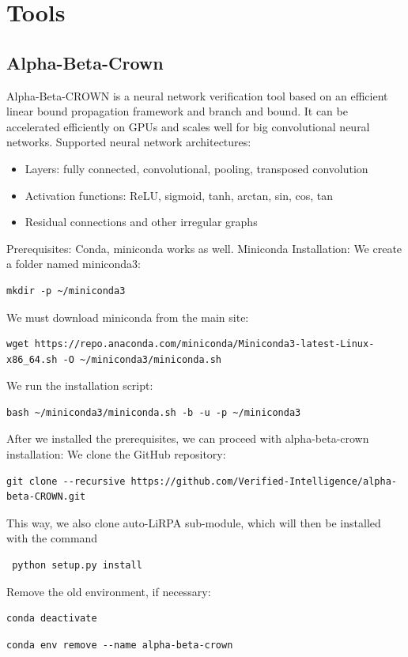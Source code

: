 \documentclass{article}
\begin{document}
\section{Tools}
\subsection{Alpha-Beta-Crown}
Alpha-Beta-CROWN\cite{alpha-beta} is a neural network verification tool based on an efficient linear bound propagation framework and branch and bound. It can be accelerated efficiently on GPUs and scales well for big convolutional neural networks.\newline
Supported neural network architectures:
\begin{itemize}
\item Layers: fully connected, convolutional, pooling, transposed convolution
\item Activation functions: ReLU, sigmoid, tanh, arctan, sin, cos, tan
\item Residual connections and other irregular graphs
\end{itemize}
\newline
Prerequisites: Conda, miniconda works as well.\newline
Miniconda Installation:
We create a folder named miniconda3:

\begin{verbatim}mkdir -p ~/miniconda3\end{verbatim}
We must download miniconda from the main site:
\begin{verbatim}wget https://repo.anaconda.com/miniconda/Miniconda3-latest-Linux-x86_64.sh -O ~/miniconda3/miniconda.sh\end{verbatim}
We run the installation script:
\begin{verbatim}bash ~/miniconda3/miniconda.sh -b -u -p ~/miniconda3
\end{verbatim}

After we installed the prerequisites, we can proceed with alpha-beta-crown installation:
We clone the GitHub repository:
\begin{verbatim}git clone --recursive https://github.com/Verified-Intelligence/alpha-beta-CROWN.git\end{verbatim}
This way, we also clone auto-LiRPA sub-module, which will then be installed with the command \begin{verbatim} python setup.py install\end{verbatim}
Remove the old environment, if necessary:
\begin{verbatim}conda deactivate\end{verbatim}
\begin{verbatim}conda env remove --name alpha-beta-crown\end{verbatim}
\end{document}
